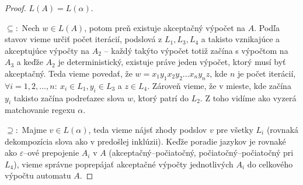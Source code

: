 \begin{proof}
$L(A) = L(\alpha).$

$\subseteq:$ Nech $w \in L(A)$, potom preň existuje akceptačný výpočet na $A$. Podľa stavov vieme určiť počet iterácií, podslová z $L_1,L_3,L_4$ a takisto vznikajúce a akceptujúce výpočty na $A_2$ -- každý takýto výpočet totiž začína s výpočtom na $A_3$ a keďže $A_2$ je de\-ter\-mi\-nis\-tic\-ký, existuje práve jeden výpočet, ktorý musí byť akceptačný. Teda vieme povedať, že $w = x_1y_1x_2y_2 \dots x_ny_nz$, kde $n$ je počet iterácií, $\forall i = 1, 2, \dots, n : ~ x_i \in L_1, y_i \in L_3 $ a $z \in L_4$. Zároveň vieme, že v mieste, kde začína $y_i$ takisto začína podreťazec slova $w$, ktorý patrí do $L_2$. Z toho vidíme ako vyzerá matchovanie regexu $\alpha$.

$\supseteq:$ Majme $v \in L(\alpha)$, teda vieme nájsť zhody podslov $v$ pre všetky $L_i$ (rovnaká dekompozícia slova ako v predošlej inklúzii). Keďže poradie jazykov je rovnaké ako $\varepsilon$--ové prepojenie $A_i$ v $A$ (akceptačný--počiatočný, počiatočný--počiatočný pri $L_4$), vieme správne poprepájať akceptačné výpočty jednotlivých $A_i$ do celkového výpočtu automatu $A$.
\end{proof}

